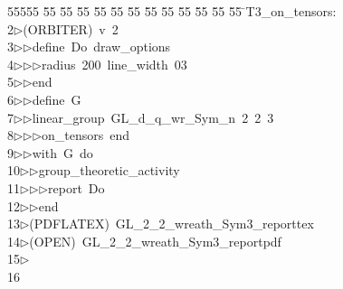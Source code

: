 %
%
\begin{tabbing}
55555 \= 55 \= 55 \= 55 \= 55 \= 55 \= 55 \= 55 \= 55 \= 55 \= 55 \= 55 \= 55 \= \>T3\_on\_tensors:\\[0pt]
2\>$\triangleright$\>(ORBITER)\ v\ 2\ \\[0pt]
3\>$\triangleright$\>$\triangleright$\>define\ Do\ draw\_options\ \\[0pt]
4\>$\triangleright$\>$\triangleright$\>$\triangleright$\>radius\ 200\ line\_width\ 03\ \\[0pt]
5\>$\triangleright$\>$\triangleright$\>end\ \\[0pt]
6\>$\triangleright$\>$\triangleright$\>define\ G\ \\[0pt]
7\>$\triangleright$\>$\triangleright$\>linear\_group\ GL\_d\_q\_wr\_Sym\_n\ 2\ 2\ 3\ \\[0pt]
8\>$\triangleright$\>$\triangleright$\>$\triangleright$\>on\_tensors\ end\ \\[0pt]
9\>$\triangleright$\>$\triangleright$\>with\ G\ do\ \\[0pt]
10\>$\triangleright$\>$\triangleright$\>group\_theoretic\_activity\ \\[0pt]
11\>$\triangleright$\>$\triangleright$\>$\triangleright$\>report\ Do\ \\[0pt]
12\>$\triangleright$\>$\triangleright$\>end\\[0pt]
13\>$\triangleright$\>(PDFLATEX)\ GL\_2\_2\_wreath\_Sym3\_reporttex\\[0pt]
14\>$\triangleright$\>(OPEN)\ GL\_2\_2\_wreath\_Sym3\_reportpdf\\[0pt]
15\>$\triangleright$\>\\[0pt]
16\>\end{tabbing}
